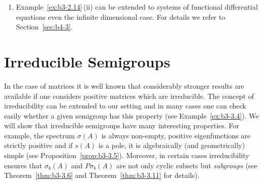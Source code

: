 \begin{remarks}
\begin{enumerate}[\upshape (i), wide, labelindent=.25em]
	\item 
	Example~\ref{ex:b3-2.14}\,(ii) can be extended to systems of functional differential equations even the infinite dimensional case.
	For details we refer to Section~\ref{sec:b4-3}.
\end{enumerate}	
\end{remarks}

\section{Irreducible Semigroups}\label{sec:b3-3}%
In the case of matrices it is well known that considerably stronger results are available if one considers positive matrices which are irreducible. 
The concept of irreducibility can be extended to our setting and in many cases one can check easily whether a given semigroup has this property (see Example~\ref{ex:b3-3.4}). 
We will show that irreducible semigroups have many interesting properties. 
For example, the spectrum $\sigma(A)$ is always non-empty, positive eigenfunctions are strictly positive and if\/ $s(A)$ is a pole, it is algebraically (and geometri­cally) simple (see Proposition~\ref{prop:b3-3.5}). 
Moreover, in certain cases irreducibility ensures that $\sigma_{b}(A)$ and $P\sigma_{b}(A)$ are not only cyclic subsets but \emph{subgroups} (see Theorem~\ref{thm:b3-3.6} and Theorem~\ref{thm:b3-3.11} for details). 

